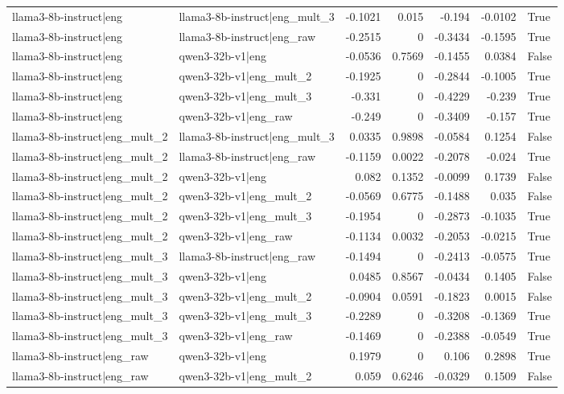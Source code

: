 \begin{table}
\begin{tabular}{l l r r r r l}
llama3-8b-instruct|eng & llama3-8b-instruct|eng_mult_3 & -0.1021 & 0.015 & -0.194 & -0.0102 & True \\
llama3-8b-instruct|eng & llama3-8b-instruct|eng_raw & -0.2515 & 0 & -0.3434 & -0.1595 & True \\
llama3-8b-instruct|eng & qwen3-32b-v1|eng & -0.0536 & 0.7569 & -0.1455 & 0.0384 & False \\
llama3-8b-instruct|eng & qwen3-32b-v1|eng_mult_2 & -0.1925 & 0 & -0.2844 & -0.1005 & True \\
llama3-8b-instruct|eng & qwen3-32b-v1|eng_mult_3 & -0.331 & 0 & -0.4229 & -0.239 & True \\
llama3-8b-instruct|eng & qwen3-32b-v1|eng_raw & -0.249 & 0 & -0.3409 & -0.157 & True \\
llama3-8b-instruct|eng_mult_2 & llama3-8b-instruct|eng_mult_3 & 0.0335 & 0.9898 & -0.0584 & 0.1254 & False \\
llama3-8b-instruct|eng_mult_2 & llama3-8b-instruct|eng_raw & -0.1159 & 0.0022 & -0.2078 & -0.024 & True \\
llama3-8b-instruct|eng_mult_2 & qwen3-32b-v1|eng & 0.082 & 0.1352 & -0.0099 & 0.1739 & False \\
llama3-8b-instruct|eng_mult_2 & qwen3-32b-v1|eng_mult_2 & -0.0569 & 0.6775 & -0.1488 & 0.035 & False \\
llama3-8b-instruct|eng_mult_2 & qwen3-32b-v1|eng_mult_3 & -0.1954 & 0 & -0.2873 & -0.1035 & True \\
llama3-8b-instruct|eng_mult_2 & qwen3-32b-v1|eng_raw & -0.1134 & 0.0032 & -0.2053 & -0.0215 & True \\
llama3-8b-instruct|eng_mult_3 & llama3-8b-instruct|eng_raw & -0.1494 & 0 & -0.2413 & -0.0575 & True \\
llama3-8b-instruct|eng_mult_3 & qwen3-32b-v1|eng & 0.0485 & 0.8567 & -0.0434 & 0.1405 & False \\
llama3-8b-instruct|eng_mult_3 & qwen3-32b-v1|eng_mult_2 & -0.0904 & 0.0591 & -0.1823 & 0.0015 & False \\
llama3-8b-instruct|eng_mult_3 & qwen3-32b-v1|eng_mult_3 & -0.2289 & 0 & -0.3208 & -0.1369 & True \\
llama3-8b-instruct|eng_mult_3 & qwen3-32b-v1|eng_raw & -0.1469 & 0 & -0.2388 & -0.0549 & True \\
llama3-8b-instruct|eng_raw & qwen3-32b-v1|eng & 0.1979 & 0 & 0.106 & 0.2898 & True \\
llama3-8b-instruct|eng_raw & qwen3-32b-v1|eng_mult_2 & 0.059 & 0.6246 & -0.0329 & 0.1509 & False \\

\end{tabular}
\end{table}
